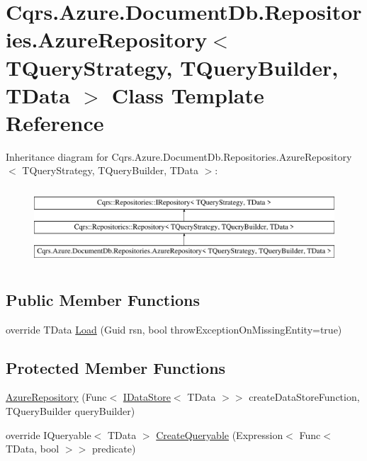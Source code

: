 \hypertarget{classCqrs_1_1Azure_1_1DocumentDb_1_1Repositories_1_1AzureRepository}{}\section{Cqrs.\+Azure.\+Document\+Db.\+Repositories.\+Azure\+Repository$<$ T\+Query\+Strategy, T\+Query\+Builder, T\+Data $>$ Class Template Reference}
\label{classCqrs_1_1Azure_1_1DocumentDb_1_1Repositories_1_1AzureRepository}
Inheritance diagram for Cqrs.\+Azure.\+Document\+Db.\+Repositories.\+Azure\+Repository$<$ T\+Query\+Strategy, T\+Query\+Builder, T\+Data $>$\+:\begin{figure}[H]
\begin{center}
\leavevmode
\includegraphics[height=2.901554cm]{classCqrs_1_1Azure_1_1DocumentDb_1_1Repositories_1_1AzureRepository}
\end{center}
\end{figure}
\subsection*{Public Member Functions}
\begin{DoxyCompactItemize}
\item 
override T\+Data \hyperlink{classCqrs_1_1Azure_1_1DocumentDb_1_1Repositories_1_1AzureRepository_a22c58163e101a6cb80f891bed6114380_a22c58163e101a6cb80f891bed6114380}{Load} (Guid rsn, bool throw\+Exception\+On\+Missing\+Entity=true)
\end{DoxyCompactItemize}
\subsection*{Protected Member Functions}
\begin{DoxyCompactItemize}
\item 
\hyperlink{classCqrs_1_1Azure_1_1DocumentDb_1_1Repositories_1_1AzureRepository_a0cd5703c46fde3eeefcb02b1d0113640_a0cd5703c46fde3eeefcb02b1d0113640}{Azure\+Repository} (Func$<$ \hyperlink{interfaceCqrs_1_1DataStores_1_1IDataStore}{I\+Data\+Store}$<$ T\+Data $>$$>$ create\+Data\+Store\+Function, T\+Query\+Builder query\+Builder)
\item 
override I\+Queryable$<$ T\+Data $>$ \hyperlink{classCqrs_1_1Azure_1_1DocumentDb_1_1Repositories_1_1AzureRepository_ac9ceeed80a02ced9a45b3443cd1f453f_ac9ceeed80a02ced9a45b3443cd1f453f}{Create\+Queryable} (Expression$<$ Func$<$ T\+Data, bool $>$$>$ predicate)
\end{DoxyCompactItemize}

